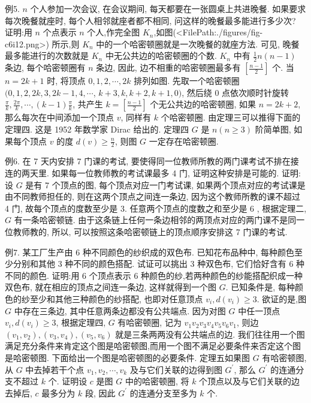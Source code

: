例5. $n$ 个人参加一次会议, 在会议期间, 每天都要在一张圆桌上共进晚餐.
如果要求每次晚餐就座时, 每个人相邻就座者都不相同, 问这样的晚餐最多能进行多少次?
证明:用 $n$ 个点表示 $n$ 个人,作完全图 $K_n$,如图(<FilePath:./figures/fig-c6i12.png>) 所示,则 $K_n$ 中的一个哈密顿圈就是一次晚餐的就座方法.
可见, 晚餐最多能进行的次数就是 $K_n$ 中无公共边的哈密顿圈的个数.
$K_n$ 中有 $\frac{1}{2} n(n-1)$ 条边, 每个哈密顿圈有 $n$ 条边, 因此, 边不相重的哈密顿圈最多有 $\left[\frac{n-1}{2}\right]$ 个.
当 $n=2 k+1$ 时, 将顶点 $0,1,2, \cdots, 2 k$ 排列如图.
先取一个哈密顿圈 $(0,1,2,2 k, 3,2 k-1,4, \cdots$, $k+3, k, k+2, k+1,0)$, 然后绕 0 点依次顺时针旋转 $\frac{\pi}{k}, \frac{2 \pi}{k}, \cdots,(k-1) \frac{\pi}{k}$, 共产生 $k=\left[\frac{n-1}{2}\right]$ 个无公共边的哈密顿圈, 如果 $n=2 k+2$, 那么每次在中间添加一个顶点 $v$, 同样有 $k$ 个哈密顿圈.
由定理三可以推得下面的定理四.
这是 1952 年数学家 Dirac 给出的.
定理四 $G$ 是 $n(n \geqslant 3)$ 阶简单图, 如果每个顶点 $v$ 的度 $d(v) \geqslant \frac{n}{2}$, 则图 $G$ 一定存在哈密顿圈.



例6. 在 7 天内安排 7 门课的考试, 要使得同一位教师所教的两门课考试不排在接连的两天里.
如果每一位教师教的考试课最多 4 门, 证明这种安排是可能的.
证明:设 $G$ 是有 7 个顶点的图, 每个顶点对应一门考试课, 如果两个顶点对应的考试课是由不同教师担任的, 则在这两个顶点之间连一条边, 因为这个教师所教的课不超过 4 门, 故每个顶点的度数至少是 3. 任意两个顶点的度数之和至少是 6 , 根据定理二, $G$ 有一条哈密顿链.
由于这条链上任何一条边相邻的两顶点对应的两门课不是同一位教师教的, 所以, 可以按照这条哈密顿链上的顶点顺序安排这 7 门课的考试.



例7. 某工厂生产由 6 种不同颜色的纱织成的双色布.
已知花布品种中, 每种颜色至少分别和其他 3 种不同的颜色搭配.
试证可以挑出 3 种双色布, 它们恰好含有 6 种不同的颜色.
证明:用 6 个顶点表示 6 种颜色的纱,若两种颜色的纱能搭配织成一种双色布, 就在相应的顶点之间连一条边, 这样就得到一个图 $G$. 已知条件是, 每种颜色的纱至少和其他三种颜色的纱搭配, 也即对任意顶点 $v_i, d\left(v_i\right) \geqslant 3$. 欲证的是,图 $G$ 中存在三条边, 其中任意两条边都没有公共端点.
因为对图 $G$ 中任一顶点 $v_i, d\left(v_i\right) \geqslant 3$, 根据定理四, $G$ 有哈密顿圈, 记为 $v_1 v_2 v_3 v_4 v_5 v_6 v_1$, 则边 $\left(v_1, v_2\right),\left(v_3, v_4\right),\left(v_5, v_6\right)$ 就是三条两两没有公共端点的边.
我们往往用一个图满足充分条件来肯定这个图是哈密顿图,而用一个图不满足必要条件来否定这个图是哈密顿图.
下面给出一个图是哈密顿图的必要条件.
定理五如果图 $G$ 有哈密顿图, 从 $G$ 中去掉若干个点 $v_1, v_2, \cdots, v_k$ 及与它们关联的边得到图 $G^{\prime}$, 那么 $G^{\prime}$ 的连通分支不超过 $k$ 个.
证明设 $c$ 是图 $G$ 中的哈密顿圈, 将 $k$ 个顶点以及与它们关联的边去掉后, $c$ 最多分为 $k$ 段, 因此 $G^{\prime}$ 的连通分支至多为 $k$ 个.



